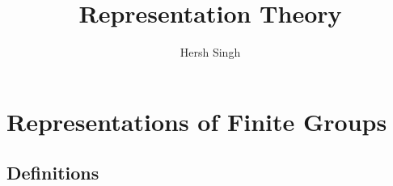 

\usepackage[
    backend=biber,
    style=alphabetic,
    sortlocale=en_US,
    hyperref=true,
    url=true, 
    doi=true,
    eprint=false
]{biblatex}


\usepackage[vcentermath]{youngtab} %
\setcounter{secnumdepth}{1}

\DeclareMathOperator{\Sym}{Sym} %
\DeclareMathOperator{\Alt}{\Lambda} %
\DeclareMathOperator{\sgn}{sgn} %
\DeclareMathOperator{\triv}{triv} %
\DeclareMathOperator{\std}{std} %
\DeclareMathOperator{\Ind}{Ind} %

\DeclareMathOperator{\id}{id}

\DeclareMathOperator{\gr}{gr}

\DeclareMathOperator{\ad}{ad}

\newcommand{\injects}{\hookrightarrow}
\newcommand{\onto}{\twoheadrightarrow}
\newcommand{\germs}{\mathcal E}
\newcommand{\defn}[1]{\textbf{#1}}
\newcommand\Weyl{\mathcal{W}}

\newcommand{\Lie}[1]{\mathfrak{\lowercase{#1}}}
\newcommand{\LieGL}{\mathfrak{gl}}
\newcommand{\LieA}{\mathfrak{a}}
\newcommand{\LieB}{\mathfrak{b}}
\newcommand{\LieG}{\mathfrak{g}}
\newcommand{\LieH}{\mathfrak{h}}
\newcommand{\LieSL}{\mathfrak{sl}}

\DeclareMathOperator\Rad{Rad}


\DeclareMathOperator\height{ht}


\title{Representation Theory}
\author{Hersh Singh}

\maketitle

\tableofcontents

\chapter{Representations of Finite Groups}
\section{Definitions}
\label{sec:definitions}

